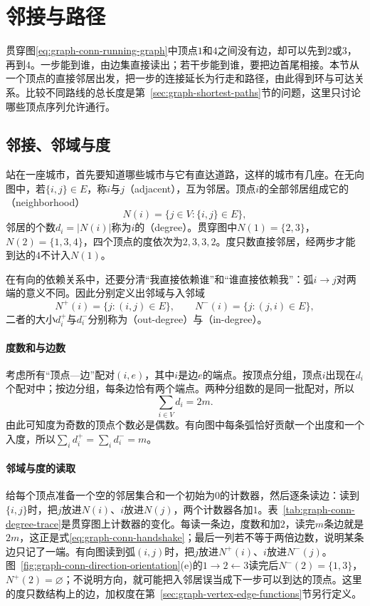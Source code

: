 \section{邻接与路径}
\label{sec:graph-adjacency-paths}

贯穿图\eqref{eq:graph-conn-running-graph}中顶点$1$和$4$之间没有边，却可以先到$2$或$3$，再到$4$。一步能到谁，由边集直接读出；若干步能到谁，要把边首尾相接。本节从一个顶点的直接邻居出发，把一步的连接延长为行走和路径，由此得到环与可达关系。比较不同路线的总长度是第~\ref{sec:graph-shortest-paths}节的问题，这里只讨论哪些顶点序列允许通行。

\subsection{邻接、邻域与度}
\label{sec:graph-conn-neighborhoods}

站在一座城市，首先要知道哪些城市与它有直达道路，这样的城市有几座。在无向图中，若$\{i,j\}\in E$，称$i$与$j$（adjacent），互为邻居。顶点$i$的全部邻居组成它的（neighborhood）
\[
N(i)=\{j\in V:\{i,j\}\in E\},
\]
邻居的个数$d_i=|N(i)|$称为$i$的（degree）。贯穿图中$N(1)=\{2,3\}$，$N(2)=\{1,3,4\}$，四个顶点的度依次为$2,3,3,2$。度只数直接邻居，经两步才能到达的$4$不计入$N(1)$。

在有向的依赖关系中，还要分清“我直接依赖谁”和“谁直接依赖我”：弧$i\to j$对两端的意义不同。因此分别定义出邻域与入邻域
\[
N^+(i)=\{j:(i,j)\in E\},\qquad
N^-(i)=\{j:(j,i)\in E\},
\]
二者的大小$d_i^+$与$d_i^-$分别称为（out-degree）与（in-degree）。

\paragraph{度数和与边数}
考虑所有“顶点—边”配对$(i,e)$，其中$i$是边$e$的端点。按顶点分组，顶点$i$出现在$d_i$个配对中；按边分组，每条边恰有两个端点。两种分组数的是同一批配对，所以
\begin{equation}
\sum_{i\in V}d_i=2m.
\label{eq:graph-conn-handshake}
\end{equation}
由此可知度为奇数的顶点个数必是偶数。有向图中每条弧恰好贡献一个出度和一个入度，所以$\sum_i d_i^+=\sum_i d_i^-=m$。

\paragraph{邻域与度的读取}
给每个顶点准备一个空的邻居集合和一个初始为$0$的计数器，然后逐条读边：读到$\{i,j\}$时，把$j$放进$N(i)$、$i$放进$N(j)$，两个计数器各加$1$。表~\ref{tab:graph-conn-degree-trace}是贯穿图上计数器的变化。每读一条边，度数和加$2$，读完$m$条边就是$2m$，这正是式\eqref{eq:graph-conn-handshake}；最后一列若不等于两倍边数，说明某条边只记了一端。有向图读到弧$(i,j)$时，把$j$放进$N^+(i)$、$i$放进$N^-(j)$。图~\ref{fig:graph-conn-direction-orientation}(e)的$1\to2\leftarrow3$读完后$N^-(2)=\{1,3\}$，$N^+(2)=\varnothing$；不说明方向，就可能把入邻居误当成下一步可以到达的顶点。这里的度只数结构上的边，加权度在第~\ref{sec:graph-vertex-edge-functions}节另行定义。


